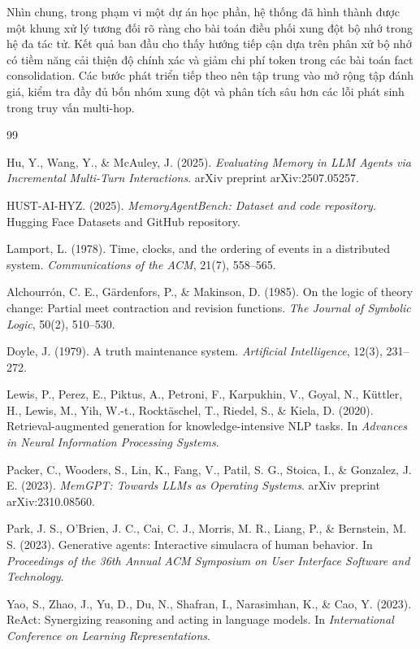 \documentclass[12pt,a4paper]{article}
\begin{document}
Nhìn chung, trong phạm vi một dự án học phần, hệ thống đã hình thành được một khung xử lý tương đối rõ ràng cho bài toán điều phối xung đột bộ nhớ trong hệ đa tác tử. Kết quả ban đầu cho thấy hướng tiếp cận dựa trên phân xử bộ nhớ có tiềm năng cải thiện độ chính xác và giảm chi phí token trong các bài toán fact consolidation. Các bước phát triển tiếp theo nên tập trung vào mở rộng tập đánh giá, kiểm tra đầy đủ bốn nhóm xung đột và phân tích sâu hơn các lỗi phát sinh trong truy vấn multi-hop.


\newpage
{}
{}

\begin{thebibliography}{99}

Hu, Y., Wang, Y., \& McAuley, J. (2025).
\textit{Evaluating Memory in LLM Agents via Incremental Multi-Turn Interactions}.
arXiv preprint arXiv:2507.05257.

HUST-AI-HYZ. (2025).
\textit{MemoryAgentBench: Dataset and code repository}.
Hugging Face Datasets and GitHub repository.

Lamport, L. (1978).
Time, clocks, and the ordering of events in a distributed system.
\textit{Communications of the ACM}, 21(7), 558--565.

Alchourrón, C. E., Gärdenfors, P., \& Makinson, D. (1985).
On the logic of theory change: Partial meet contraction and revision functions.
\textit{The Journal of Symbolic Logic}, 50(2), 510--530.

Doyle, J. (1979).
A truth maintenance system.
\textit{Artificial Intelligence}, 12(3), 231--272.

Lewis, P., Perez, E., Piktus, A., Petroni, F., Karpukhin, V., Goyal, N.,
Küttler, H., Lewis, M., Yih, W.-t., Rocktäschel, T., Riedel, S., \& Kiela, D. (2020).
Retrieval-augmented generation for knowledge-intensive NLP tasks.
In \textit{Advances in Neural Information Processing Systems}.

Packer, C., Wooders, S., Lin, K., Fang, V., Patil, S. G., Stoica, I.,
\& Gonzalez, J. E. (2023).
\textit{MemGPT: Towards LLMs as Operating Systems}.
arXiv preprint arXiv:2310.08560.

Park, J. S., O'Brien, J. C., Cai, C. J., Morris, M. R., Liang, P.,
\& Bernstein, M. S. (2023).
Generative agents: Interactive simulacra of human behavior.
In \textit{Proceedings of the 36th Annual ACM Symposium on User Interface Software and Technology}.

Yao, S., Zhao, J., Yu, D., Du, N., Shafran, I., Narasimhan, K.,
\& Cao, Y. (2023).
ReAct: Synergizing reasoning and acting in language models.
In \textit{International Conference on Learning Representations}.


\end{thebibliography}
\end{document}

